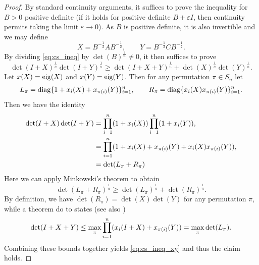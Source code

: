 \documentclass[notitlepage, 10pt]{article}
\begin{document}
\begin{proof}
    By standard continuity arguments, it suffices to prove the inequality for $B > 0$ positive definite (if it holds for positive definite $B+\varepsilon I$, then continuity permits taking the limit $\varepsilon \to 0$).
    As $B$ is positive definite, it is also invertible and we may define
    \begin{equation}
        X = B^{-\frac{1}{2}}AB^{-\frac{1}{2}}, \qquad
        Y = B^{-\frac{1}{2}}CB^{-\frac{1}{2}}.
    \end{equation}
    By dividing \cref{eq:cs_ineq} by $\det(B)^{\frac{2}{n}} \neq 0$, it then suffices to prove
    \begin{equation}
        \label{eq:cs_ineq_xy}
        \det (I+X)^{\frac1n} \det (I+Y)^{\frac1n} \geq \det (I+X+Y)^{\frac1n} + \det (X)^{\frac1n} \det(Y)^{\frac1n}.
    \end{equation}
    Let $x(X) = \operatorname{eig}(X)$ and $x(Y) = \operatorname{eig}(Y)$. Then for any permutation $\pi \in S_n$ let
    \begin{equation}
        L_{\pi} = \operatorname{diag}\{1+x_i(X) + x_{\pi(i)}(Y)\}_{i=1}^{n}, \qquad R_{\pi} = \operatorname{diag}\{x_i(X)x_{\pi(i)}(Y)\}_{i=1}^{n}.
    \end{equation}
    Then we have the identity
    \begin{align}
        \det(I+X)\det(I+Y)
        &= \prod_{i=1}^{n} (1+x_i(X)) \prod_{i=1}^{n} (1+x_i(Y)), \\
        &= \prod_{i=1}^{n} (1+x_i(X) + x_{\pi(i)}(Y) + x_i(X)x_{\pi(i)}(Y)),\\
        &= \det(L_{\pi} + R_{\pi})
    \end{align}
    Here we can apply Minkowski's theorem to obtain
    \begin{equation}
        \det(L_{\pi} + R_{\pi})^{\frac{1}{n}} \geq \det(L_{\pi})^{\frac{1}{n}} + \det(R_{\pi})^{\frac{1}{n}}.
    \end{equation}
    By definition, we have $\det(R_{\pi}) = \det(X)\det(Y)$ for any permutation $\pi$, while a theorem do to \citeauthor{fiedler1971bounds} \cite{fiedler1971bounds} states (see also \cite[Exercise VI.7.2,Theorem VI.7.1]{bhatia1997matrix})
    \begin{equation}
        \det(I+X+Y) \leq \max_{\pi} \prod_{i=1}^{n} (x_i(I+X) + x_{\pi(i)}(Y)) = \max_{\pi} \det(L_{\pi}).
    \end{equation}
    Combining these bounds together yields \cref{eq:cs_ineq_xy} and thus the claim holds.
\end{proof}
\end{document}
